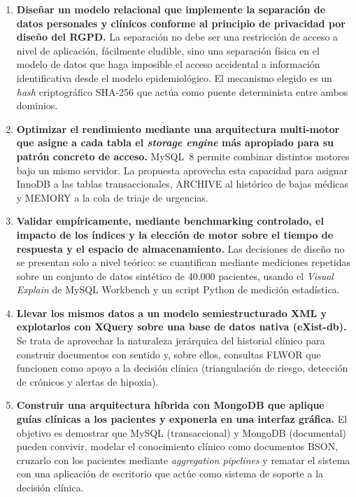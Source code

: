 \documentclass[../main.tex]{subfiles}
\begin{document}
\begin{enumerate}

    \item \textbf{Diseñar un modelo relacional que implemente la separación de datos personales y clínicos conforme al principio de privacidad por diseño del RGPD.} La separación no debe ser una restricción de acceso a nivel de aplicación, fácilmente eludible, sino una separación física en el modelo de datos que haga imposible el acceso accidental a información identificativa desde el modelo epidemiológico. El mecanismo elegido es un \textit{hash} criptográfico SHA-256 que actúa como puente determinista entre ambos dominios.
    \\
    \item \textbf{Optimizar el rendimiento mediante una arquitectura multi-motor que asigne a cada tabla el \textit{storage engine} más apropiado para su patrón concreto de acceso.} MySQL~8 permite combinar distintos motores bajo un mismo servidor. La propuesta aprovecha esta capacidad para asignar InnoDB a las tablas transaccionales, ARCHIVE al histórico de bajas médicas y MEMORY a la cola de triaje de urgencias.

    \item \textbf{Validar empíricamente, mediante benchmarking controlado, el impacto de los índices y la elección de motor sobre el tiempo de respuesta y el espacio de almacenamiento.} Las decisiones de diseño no se presentan solo a nivel teórico: se cuantifican mediante mediciones repetidas sobre un conjunto de datos sintético de 40.000 pacientes, usando el \textit{Visual Explain} de MySQL Workbench y un script Python de medición estadística.

    \item \textbf{Llevar los mismos datos a un modelo semiestructurado XML y explotarlos con XQuery sobre una base de datos nativa (eXist-db).} Se trata de aprovechar la naturaleza jerárquica del historial clínico para construir documentos con sentido y, sobre ellos, consultas FLWOR que funcionen como apoyo a la decisión clínica (triangulación de riesgo, detección de crónicos y alertas de hipoxia).

    \item \textbf{Construir una arquitectura híbrida con MongoDB que aplique guías clínicas a los pacientes y exponerla en una interfaz gráfica.} El objetivo es demostrar que MySQL (transaccional) y MongoDB (documental) pueden convivir, modelar el conocimiento clínico como documentos BSON, cruzarlo con los pacientes mediante \textit{aggregation pipelines} y rematar el sistema con una aplicación de escritorio que actúe como sistema de soporte a la decisión clínica.

\end{enumerate}
\end{document}
